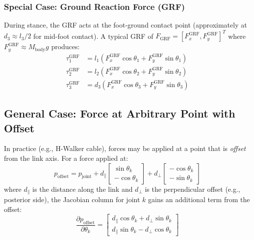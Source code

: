 \documentclass[11pt,a4paper]{article}
\newcommand{\vc}[1]{\bm{#1}}
\newcommand{\pder}[2]{\frac{\partial #1}{\partial #2}}
\def\vc#1{#1}%
\def\bm#1{#1}%
\begin{document}
\subsubsection*{Special Case: Ground Reaction Force (GRF)}

During stance, the GRF acts at the foot-ground contact point (approximately at $d_3 \approx l_3/2$
for mid-foot contact). A typical GRF of $\vc{F}_{\text{GRF}} = [F_x^{\text{GRF}}, F_y^{\text{GRF}}]^T$
where $F_y^{\text{GRF}} \approx M_{\text{body}} g$ produces:
\begin{align}
    \tau_1^{\text{GRF}} &= l_1 (F_x^{\text{GRF}} \cos\theta_1 + F_y^{\text{GRF}} \sin\theta_1) \\
    \tau_2^{\text{GRF}} &= l_2 (F_x^{\text{GRF}} \cos\theta_2 + F_y^{\text{GRF}} \sin\theta_2) \\
    \tau_3^{\text{GRF}} &= d_3 (F_x^{\text{GRF}} \cos\theta_3 + F_y^{\text{GRF}} \sin\theta_3)
\end{align}

\subsection{General Case: Force at Arbitrary Point with Offset}

In practice (e.g., H-Walker cable), forces may be applied at a point
that is \textit{offset} from the link axis. For a force applied at:
\begin{equation}
    \vc{p}_{\text{offset}} = \vc{p}_{\text{joint}} + d_{\parallel}
    \begin{bmatrix} \sin\theta_k \\ -\cos\theta_k \end{bmatrix}
    + d_{\perp}
    \begin{bmatrix} -\cos\theta_k \\ -\sin\theta_k \end{bmatrix}
    \label{eq:offset_point}
\end{equation}
where $d_{\parallel}$ is the distance along the link and $d_{\perp}$ is the
perpendicular offset (e.g., posterior side), the Jacobian column for joint $k$
gains an additional term from the offset:
\begin{equation}
    \pder{\vc{p}_{\text{offset}}}{\theta_k} =
    \begin{bmatrix}
        d_{\parallel}\cos\theta_k + d_{\perp}\sin\theta_k \\
        d_{\parallel}\sin\theta_k - d_{\perp}\cos\theta_k
    \end{bmatrix}
    \label{eq:J_offset_column}
\end{equation}
\end{document}

